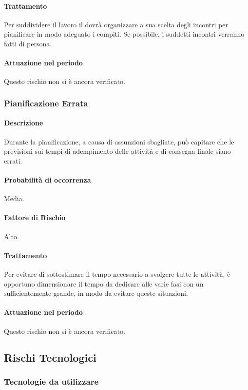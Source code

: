 \paragraph{Trattamento}
Per suddividere il lavoro il \Pm dovrà organizzare a sua scelta degli incontri per pianificare in modo adeguato i compiti. Se possibile, i suddetti incontri verranno fatti di persona.
\paragraph{Attuazione nel periodo}
Questo rischio non si è ancora verificato.

\subsubsection{Pianificazione Errata}
\paragraph{Descrizione}
Durante la pianificazione, a causa di assunzioni sbagliate, può capitare che le previsioni sui tempi di adempimento delle attività e di consegna finale siano errati. 
\paragraph{Probabilità di occorrenza}
Media.
\paragraph{Fattore di Rischio}
Alto.
\paragraph{Trattamento}
Per evitare di sottostimare il tempo necessario a svolgere tutte le attività, è opportuno dimensionare il tempo da dedicare alle varie fasi con un  sufficientemente grande, in modo da evitare queste situazioni.
\paragraph{Attuazione nel periodo}
Questo rischio non si è ancora verificato.

\subsection{Rischi Tecnologici}
\subsubsection{Tecnologie da utilizzare}
